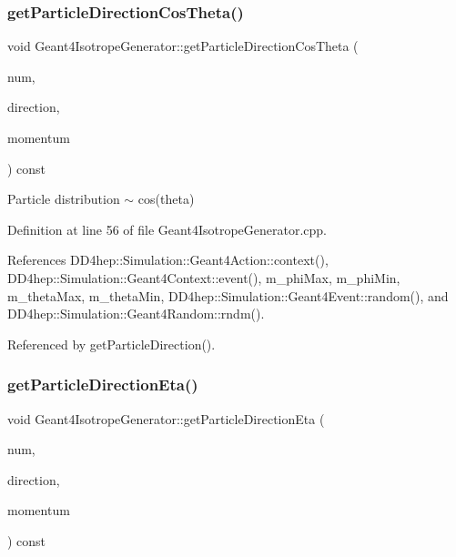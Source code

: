 \subsubsection{\texorpdfstring{get\+Particle\+Direction\+Cos\+Theta()}{getParticleDirectionCosTheta()}}
{\footnotesize\ttfamily void Geant4\+Isotrope\+Generator\+::get\+Particle\+Direction\+Cos\+Theta (\begin{DoxyParamCaption}\item[{int}]{num,  }\item[{R\+O\+O\+T\+::\+Math\+::\+X\+Y\+Z\+Vector \&}]{direction,  }\item[{double \&}]{momentum }\end{DoxyParamCaption}) const\hspace{0.3cm}{\ttfamily [protected]}}



Particle distribution $\sim$ cos(theta) 



Definition at line 56 of file Geant4\+Isotrope\+Generator.\+cpp.



References D\+D4hep\+::\+Simulation\+::\+Geant4\+Action\+::context(), D\+D4hep\+::\+Simulation\+::\+Geant4\+Context\+::event(), m\+\_\+phi\+Max, m\+\_\+phi\+Min, m\+\_\+theta\+Max, m\+\_\+theta\+Min, D\+D4hep\+::\+Simulation\+::\+Geant4\+Event\+::random(), and D\+D4hep\+::\+Simulation\+::\+Geant4\+Random\+::rndm().



Referenced by get\+Particle\+Direction().

\hypertarget{class_d_d4hep_1_1_simulation_1_1_geant4_isotrope_generator_a0b5062aadd8a736fe9d287aeda411a3c}{}\label{class_d_d4hep_1_1_simulation_1_1_geant4_isotrope_generator_a0b5062aadd8a736fe9d287aeda411a3c} 
\subsubsection{\texorpdfstring{get\+Particle\+Direction\+Eta()}{getParticleDirectionEta()}}
{\footnotesize\ttfamily void Geant4\+Isotrope\+Generator\+::get\+Particle\+Direction\+Eta (\begin{DoxyParamCaption}\item[{int}]{num,  }\item[{R\+O\+O\+T\+::\+Math\+::\+X\+Y\+Z\+Vector \&}]{direction,  }\item[{double \&}]{momentum }\end{DoxyParamCaption}) const\hspace{0.3cm}{\ttfamily [protected]}}



